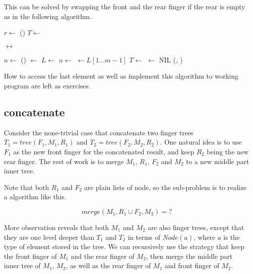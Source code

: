 \documentclass[UTF8]{article}
\begin{document}
This can be solved by swapping the front and the rear finger if the rear is empty as in the
following algorithm.

\begin{algorithmic}
  \State $r \gets$ ()
  \State {}
    \State $T \gets$ 
  \EndWhile

    \State {}  $\leftrightarrow$ 
  \EndIf

  \State $n \gets $ ()
  \State {} $\gets$ 
  \Repeat
    \State $L \gets$  
    \State $n \gets$  
    \State {} $\gets L[1...m-1]$ 
    \State $T \gets $ 
      \State {} $\gets$ NIL
    \EndIf
  \State \Return (, )
\EndFunction
\end{algorithmic}

How to access the last element as well as implement this algorithm to working program are
left as exercises.

\subsection{concatenate}

Consider the none-trivial case that concatenate two finger trees $T_1 = tree(F_1, M_1, R_1)$ and
$T_2 = tree(F_2, M_2, R_2)$. One natural idea is to use $F_1$ as the new front finger for the
concatenated result, and keep $R_2$ being the new rear finger. The rest of work is to merge
$M_1$, $R_1$, $F_2$ and $M_2$ to a new middle part inner tree.

Note that both $R_1$ and $F_2$ are plain lists of node, so the sub-problem is to realize a
algorithm like this.

\[
merge(M_1, R_1 \cup F_2, M_2) = ?
\]

More observation reveals that both $M_1$ and $M_2$ are also finger trees, except that they
are one level deeper than $T_1$ and $T_2$ in terms of $Node(a)$, where $a$ is the type of
element stored in the tree. We can recursively use the strategy that keep the front finger
of $M_1$ and the rear finger of $M_2$, then merge the middle part inner tree of $M_1$, $M_2$,
as well as the rear finger of $M_1$ and front finger of $M_2$.
\end{document}
